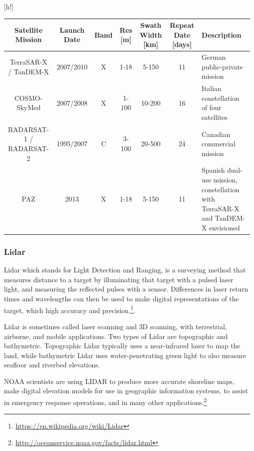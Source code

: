 \documentclass{article}
\makeatletter
\renewenvironment{table}
     {\@float{table} \small}
     {\end@float}
\makeatother
\begin{document}
\begin{table}[h!]
\caption{Commercial Radar Remote Sensing Satellites. Source:\url{http://eijournal.com/print/articles/discover-the-benefits-of-radar-imaging}}
\label{tb:radars}
\begin{tabularx}{\textwidth}{C{1.4}C{0.8}C{0.5}C{1}C{1}C{0.5}L{1.8}}
\toprule
Satellite Mission &
Launch Date &
Band & 
Res [m] &
Swath Width [km] &
Repeat Date [days] &
Description \\ 
\midrule
TerraSAR-X / TanDEM-X & 2007/2010 & X & 1-18 & 5-150 & 11 & German public-private mission \\
COSMO-SkyMed & 2007/2008 & X & 1-100 & 10-200 & 16 & Italian constellation of four satellites \\
RADARSAT-1 / RADARSAT-2 & 1995/2007 & C & 3-100 & 20-500 & 24 & Canadian commercial mission \\
PAZ & 2013 & X & 1-18 & 5-150  & 11 & Spanish dual-use mission, constellation with TerraSAR-X and TanDEM-X envisioned \\ 
\bottomrule
\end{tabularx}
\end{table}


\subsubsection{Lidar}

Lidar which stands for Light Detection and Ranging, is a surveying method that measures distance to a target by illuminating that target with a pulsed laser light, and measuring the reflected pulses with a sensor. 
Differences in laser return times and wavelengths can then be used to make digital representations of the target, which high accuracy and precision.\footnote{\url{https://en.wikipedia.org/wiki/Lidar}}.

Lidar  is sometimes called laser scanning and 3D scanning, with terrestrial, airborne, and mobile applications. Two types of Lidar are topographic and bathymetric. Topographic Lidar typically uses a near-infrared laser to map the land, while bathymetric Lidar uses water-penetrating green light to also measure seafloor and riverbed elevations.

NOAA scientists are using LIDAR to produce more accurate shoreline maps, make digital elevation models for use in geographic information systems, to assist in emergency response operations, and in many other applications.\footnote{\url{http://oceanservice.noaa.gov/facts/lidar.html}}
\end{document}
